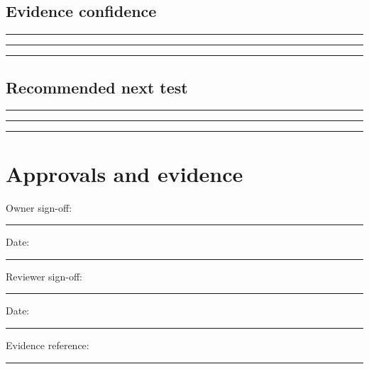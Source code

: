 \documentclass[11pt]{article}
\begin{document}
\subsection{Evidence confidence}
\noindent\rule{\linewidth}{0.3pt}\par\vspace{0.18in}
\noindent\rule{\linewidth}{0.3pt}\par\vspace{0.18in}
\noindent\rule{\linewidth}{0.3pt}\par\vspace{0.14in}

\subsection{Recommended next test}
\noindent\rule{\linewidth}{0.3pt}\par\vspace{0.18in}
\noindent\rule{\linewidth}{0.3pt}\par\vspace{0.18in}
\noindent\rule{\linewidth}{0.3pt}\par\vspace{0.14in}

\section{Approvals and evidence}
\noindent Owner sign-off: \rule{0.42\linewidth}{0.4pt}\hfill Date: \rule{0.19\linewidth}{0.4pt}\par\vspace{0.4cm}
\noindent Reviewer sign-off: \rule{0.40\linewidth}{0.4pt}\hfill Date: \rule{0.19\linewidth}{0.4pt}\par\vspace{0.4cm}
\noindent Evidence reference: \rule{0.70\linewidth}{0.4pt}
\end{document}
